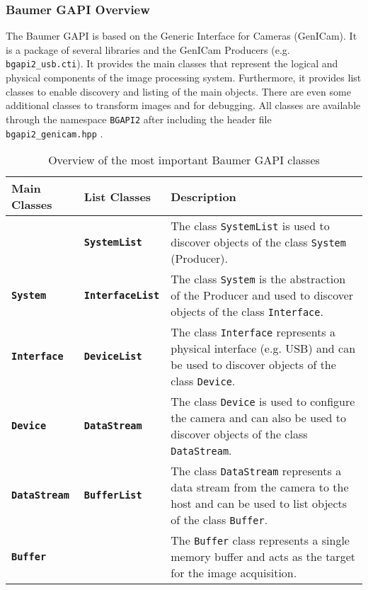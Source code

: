 \subsubsection{Baumer GAPI Overview}
\label{subsubsec:baumer_gapi_overview}

The Baumer GAPI is based on the Generic Interface for Cameras (GenICam).
It is a package of several libraries and the GenICam Producers (e.g. \texttt{bgapi2\_usb.cti}).
It provides the main classes that represent the logical and physical components of the image processing system.
Furthermore, it provides list classes to enable discovery and listing of the main objects.
There are even some additional classes to transform images and for debugging.
All classes are available through the namespace \texttt{BGAPI2} after including the header file \texttt{bgapi2\_genicam.hpp} \cite{baumer_gapi}.

\begin{table}[ht]
  \caption{Overview of the most important Baumer GAPI classes \cite{baumer_gapi}}
  \label{tab:baumer_gapi}
  \centering
  \begin{tabular}{llp{8.5cm}}
    \toprule
    \textbf{Main Classes} & \textbf{List Classes} & \textbf{Description} \\
    \midrule
     & \textbf{\texttt{SystemList}} & The class \texttt{SystemList} is used to discover objects of the class \texttt{System} (Producer). \\
    \midrule
    \textbf{\texttt{System}} & \textbf{\texttt{InterfaceList}} & The class \texttt{System} is the abstraction of the Producer and used to discover objects of the class \texttt{Interface}. \\
    \midrule
    \textbf{\texttt{Interface}} & \textbf{\texttt{DeviceList}} & The class \texttt{Interface} represents a physical interface (e.g. USB) and can be used to discover objects of the class \texttt{Device}. \\
    \midrule
    \textbf{\texttt{Device}} & \textbf{\texttt{DataStream}} & The class \texttt{Device} is used to configure the camera and can also be used to discover objects of the class \texttt{DataStream}. \\
    \midrule
    \textbf{\texttt{DataStream}} & \textbf{\texttt{BufferList}} & The class \texttt{DataStream} represents a data stream from the camera to the host and can be used to list objects of the class \texttt{Buffer}. \\
    \midrule
    \textbf{\texttt{Buffer}} &  & The \texttt{Buffer} class represents a single memory buffer and acts as the target for the image acquisition. \\
    \bottomrule
  \end{tabular}
\end{table}
